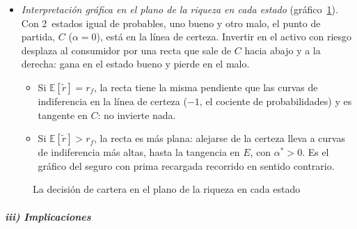 \documentclass[11pt]{article}
\begin{document}
\begin{itemize}
\item \emph{Interpretación gráfica en el plano de la riqueza en cada estado} (gráfico~\ref{fig:cartera-riqueza}). Con 2~estados igual de probables, uno bueno y otro malo, el punto de partida, $C$ ($\alpha=0$), está en la línea de certeza. Invertir en el activo con riesgo desplaza al consumidor por una recta que sale de $C$ hacia abajo y a la derecha: gana en el estado bueno y pierde en el malo.
  \begin{itemize}
  \item Si $\mathbb{E}[\tilde{r}]=r_f$, la recta tiene la misma pendiente que las curvas de indiferencia en la línea de certeza ($-1$, el cociente de probabilidades) y es tangente en $C$: no invierte nada.
  \item Si $\mathbb{E}[\tilde{r}]>r_f$, la recta es más plana: alejarse de la certeza lleva a curvas de indiferencia más altas, hasta la tangencia en $E$, con $\alpha^*>0$. Es el gráfico del seguro con prima recargada recorrido en sentido contrario.
  \end{itemize}
\end{itemize}

\begin{figure}[H]
\centering
\caption{La decisión de cartera en el plano de la riqueza en cada estado}\label{fig:cartera-riqueza}
\end{figure}

\subparagraph{iii) Implicaciones}
\end{document}
